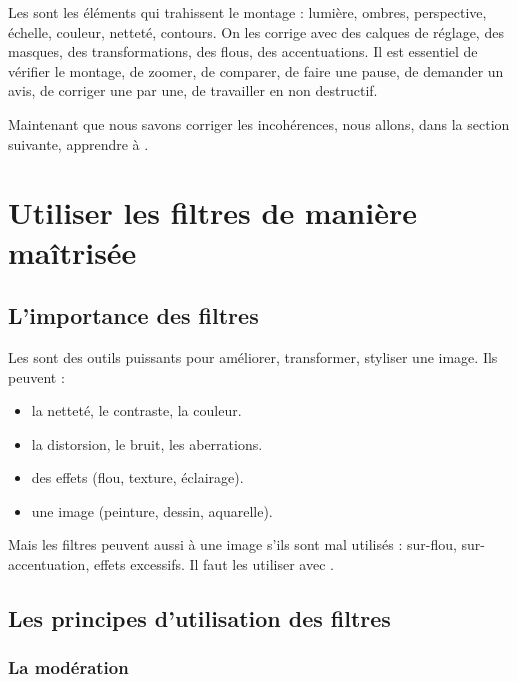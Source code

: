 Les  sont les éléments qui trahissent le montage : lumière, ombres, perspective, échelle, couleur, netteté, contours. On les corrige avec des calques de réglage, des masques, des transformations, des flous, des accentuations. Il est essentiel de vérifier le montage, de zoomer, de comparer, de faire une pause, de demander un avis, de corriger une par une, de travailler en non destructif.

Maintenant que nous savons corriger les incohérences, nous allons, dans la section suivante, apprendre à .

\section{Utiliser les filtres de manière maîtrisée}

\subsection{L'importance des filtres}

Les  sont des outils puissants pour améliorer, transformer, styliser une image. Ils peuvent :

\begin{itemize}
    \item {} la netteté, le contraste, la couleur.
    \item {} la distorsion, le bruit, les aberrations.
    \item {} des effets (flou, texture, éclairage).
    \item {} une image (peinture, dessin, aquarelle).
\end{itemize}

Mais les filtres peuvent aussi  à une image s'ils sont mal utilisés : sur-flou, sur-accentuation, effets excessifs. Il faut les utiliser avec .

\subsection{Les principes d'utilisation des filtres}

\subsubsection{La modération}


